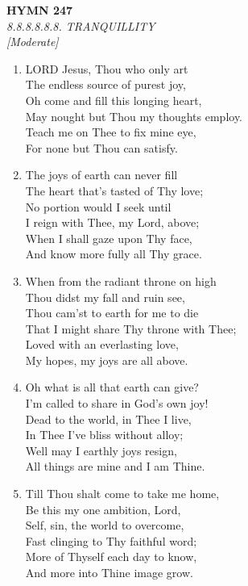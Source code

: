 \documentclass[11pt,a4paper]{article}
\begin{document}
\newpage
\begin{center}
    {\Large \textbf{HYMN 247}}
    \\
    \textit{8.8.8.8.8.8. TRANQUILLITY}
    \\
    \textit{\small [Moderate]}
\end{center}
\vspace{1em}

\begin{enumerate}
    \item LORD Jesus, Thou who only art \\
        The endless source of purest joy, \\
        Oh come and fill this longing heart, \\
        May nought but Thou my thoughts employ. \\
        Teach me on Thee to fix mine eye, \\
        For none but Thou can satisfy.

    \item The joys of earth can never fill \\
        The heart that's tasted of Thy love; \\
        No portion would I seek until \\
        I reign with Thee, my Lord, above; \\
        When I shall gaze upon Thy face, \\
        And know more fully all Thy grace.

    \item When from the radiant throne on high \\
        Thou didst my fall and ruin see, \\
        Thou cam'st to earth for me to die \\
        That I might share Thy throne with Thee; \\
        Loved with an everlasting love, \\
        My hopes, my joys are all above.

    \item Oh what is all that earth can give? \\
        I'm called to share in God's own joy! \\
        Dead to the world, in Thee I live, \\
        In Thee I've bliss without alloy; \\
        Well may I earthly joys resign, \\
        All things are mine and I am Thine.

    \item Till Thou shalt come to take me home, \\
        Be this my one ambition, Lord, \\
        Self, sin, the world to overcome, \\
        Fast clinging to Thy faithful word; \\
        More of Thyself each day to know, \\
        And more into Thine image grow.

\end{enumerate}
\end{document}
